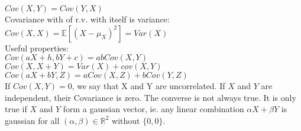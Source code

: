 $Cov(X,Y) = Cov(Y,X)$\\

Covariance with of r.v. with itself is variance:\\

$Cov(X,X) = \mathbb E[(X - \mu _ X)^2] = Var(X)$\\

Useful properties:\\

$Cov(aX + h,bY + c)= abCov(X,Y)$\\

$Cov(X,X + Y)= Var(X) + cov(X,Y)$\\

$\displaystyle  Cov(aX+ bY, Z) \displaystyle = aCov(X,Z) + bCov(Y,Z)$\\

If $Cov(X,Y) = 0$, we say that X and Y are uncorrelated. If $X$ and $Y$ are independent, their Covariance is zero. The converse is not always true. It is only true if $X$ and $Y$ form a gaussian vector, ie. any linear combination $\alpha X + \beta Y$ is gaussian for all $(\alpha,\beta) \in \mathbb{R}^2$ without $\{0,0\}$.
